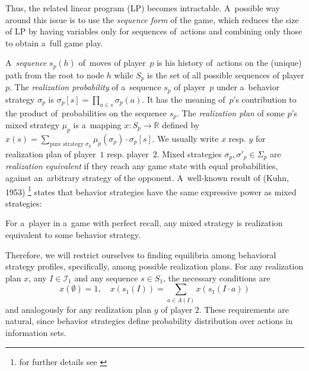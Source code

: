 Thus, the related linear program (LP) becomes intractable.
A~possible way around this issue is to use the \emph{sequence form} of the game, which reduces the size of LP by having variables only for sequences of~actions and combining only those to obtain a~full game play.

A~\emph{sequence} $s_p(h)$ of~moves of player~$p$ is his history of~actions on the (unique) path from the root to node $h$ while $S_p$ is the set of all possible sequences of player $p$.
The \emph{realization probability} of a~sequence $s_p$ of player~$p$ under a~behavior strategy $\sigma _p$ is $\sigma _p [s] = \prod_{a \in s} \sigma _p(a)$.
It has the meaning of~$p$'s contribution to the product of~probabilities on the sequence $s_p$.
The \emph{realization plan} of some $p$'s mixed strategy $\mu_p$ is a~mapping $x\colon S_p \to \mathbb{R}$ defined by
$x(s) = \sum _{\textrm{pure strategy } \sigma _p} \mu _p (\sigma _p) \cdot \sigma _p [s]$.
We usually write $x$ resp. $y$ for realization plan of player~$1$ resp. player~$2$.
Mixed strategies $\sigma _p, \sigma' _p \in \Sigma _p$ are \emph{realization equivalent} if they reach any game state with equal probabilities, against an~arbitrary strategy of the opponent.
A~well-known result of (Kuhn, 1953)%
\footnote{for further details see \cite{AGT07}}
states that behavior strategies have the same expressive power as mixed strategies:
\begin{thm}
For a~player in a~game with perfect recall, any mixed strategy is realization equivalent to some behavior strategy.
\end{thm}
Therefore, we will restrict ourselves to finding equilibria among behavioral strategy profiles, specifically, among possible realization plans.
For any realization plan $x$, any $I \in \mathcal{I}_1$ and any sequence $s\in S_1$, the necessary conditions are
\begin{equation}
\label{seq-cond}
    x(\emptyset) = 1, \quad x(s_1(I)) = \sum _{a \in A(I)} x(s_1(I \cdot a))
\end{equation}
and analogously for any realization plan $y$ of player $2$.
These requirements are natural, since behavior strategies define probability distribution over actions in information sets.

